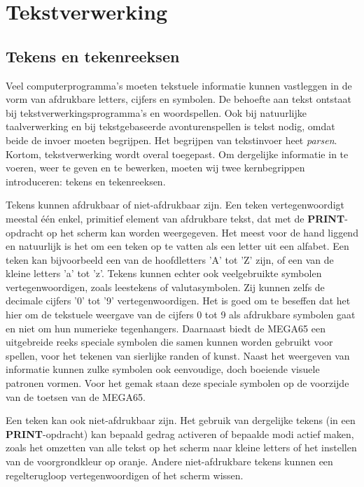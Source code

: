 \chapter{Tekstverwerking}

\section{Tekens en tekenreeksen}Veel computerprogramma's moeten tekstuele informatie kunnen vastleggen in de vorm van afdrukbare letters, cijfers en symbolen. De behoefte aan tekst ontstaat bij tekstverwerkingsprogramma's en woordspellen. Ook bij natuurlijke taalverwerking en bij tekstgebaseerde avonturenspellen is tekst nodig, omdat beide de invoer moeten begrijpen. Het begrijpen van tekstinvoer heet {\it parsen}. Kortom, tekstverwerking wordt overal toegepast. Om dergelijke informatie in te voeren, weer te geven en te bewerken, moeten wij twee kernbegrippen introduceren: tekens en tekenreeksen.

Tekens kunnen afdrukbaar of niet-afdrukbaar zijn. Een teken vertegenwoordigt meestal één enkel, primitief element van afdrukbare tekst, dat met de {\bf PRINT}-opdracht op het scherm kan worden weergegeven. Het meest voor de hand liggend en natuurlijk is het om een teken op te vatten als een letter uit een alfabet. Een teken kan bijvoorbeeld een van de hoofdletters 'A' tot 'Z' zijn, of een van de kleine letters 'a' tot 'z'. Tekens kunnen echter ook veelgebruikte symbolen vertegenwoordigen, zoals leestekens of valutasymbolen. Zij kunnen zelfs de decimale cijfers '0' tot '9' vertegenwoordigen. Het is goed om te beseffen dat het hier om de tekstuele weergave van de cijfers 0 tot 9 als afdrukbare symbolen gaat en niet om hun numerieke tegenhangers. Daarnaast biedt de MEGA65 een uitgebreide reeks speciale symbolen die samen kunnen worden gebruikt voor spellen, voor het tekenen van sierlijke randen of kunst. Naast het weergeven van informatie kunnen zulke symbolen ook eenvoudige, doch boeiende visuele patronen vormen. Voor het gemak staan deze speciale symbolen op de voorzijde van de toetsen van de MEGA65.

Een teken kan ook niet-afdrukbaar zijn. Het gebruik van dergelijke tekens (in een {\bf PRINT}-opdracht) kan bepaald gedrag activeren of bepaalde modi actief maken, zoals het omzetten van alle tekst op het scherm naar kleine letters of het instellen van de voorgrondkleur op oranje. Andere niet-afdrukbare tekens kunnen een regelterugloop vertegenwoordigen of het scherm wissen.

